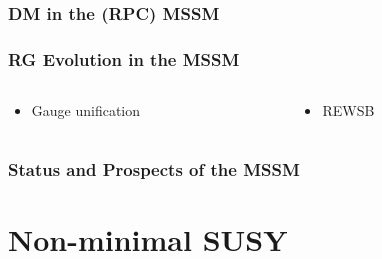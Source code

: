 \documentclass[10pt,aspectratio=169]{beamer}
\begin{document}
\begin{frame}
  \frametitle{DM in the (RPC) MSSM}
\end{frame}

\begin{frame}
  \frametitle{RG Evolution in the MSSM}
  \begin{columns}[t]
    \begin{column}{0.5\textwidth}
      \begin{itemize}\itemsep1em
      \item Gauge unification
      \end{itemize}
    \end{column}
    \begin{column}{0.5\textwidth}
      \begin{itemize}\itemsep1em
        \item REWSB
      \end{itemize}
    \end{column}
  \end{columns}
\end{frame}

\begin{frame}
  \frametitle{Status and Prospects of the MSSM}
\end{frame}

\section{Non-minimal SUSY}
\end{document}
